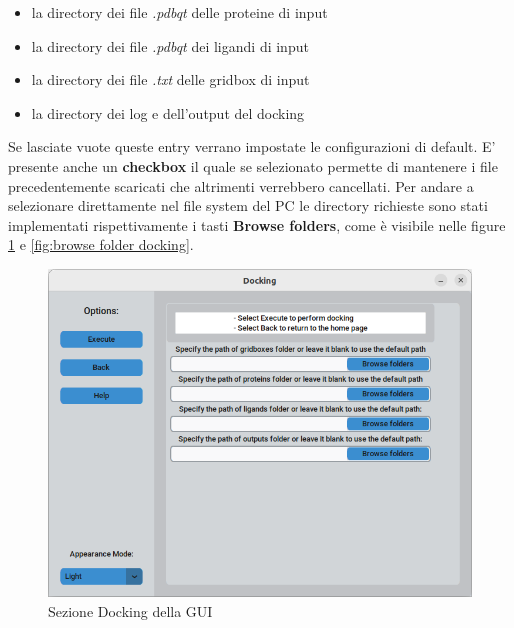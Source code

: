 \begin{itemize}
    \item la directory dei file \textit{.pdbqt} delle proteine di input
    \item la directory dei file \textit{.pdbqt} dei ligandi di input
    \item la directory dei file \textit{.txt} delle gridbox di input
    \item la directory dei log e dell'output del docking
\end{itemize}

Se lasciate vuote queste entry verrano impostate le configurazioni di default. E' presente anche un \textbf{checkbox} il quale se selezionato permette di mantenere i file precedentemente scaricati che altrimenti verrebbero cancellati.\newline
Per andare a selezionare direttamente nel file system del PC le directory richieste sono stati implementati rispettivamente i tasti \textbf{Browse folders}, come è visibile nelle figure \ref{fig:docking} e \ref{fig:browse folder docking}.

\begin{figure}[H]
    \centering
    \includegraphics[scale=0.6]{immagini/capitolo3/docking.png}
    \caption{Sezione Docking della GUI}
    \label{fig:docking}
\end{figure}

